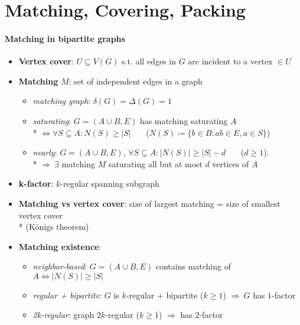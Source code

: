 \section{Matching, Covering, Packing}

\paragraph{Matching in bipartite graphs}
\begin{itemize}
  \item \textbf{Vertex cover}: $ U \subseteq V(G) $ s.t. all edges in $ G $ are incident to a vertex $ \in U $
  \item \textbf{Matching} $ M $: set of independent edges in a graph
  \begin{itemize}
    \item \emph{matching graph}: $ \delta(G) = \Delta(G) = 1 $
    \item \emph{saturating}: $ G = (A \cup B, E) $ has matching saturating $ A $ \\*
       $\Leftrightarrow \forall S \subseteq A : N(S) \geq \vert S \vert $ \ \ \ ($ N(S) \coloneqq \{ b \in B : ab \in E, a \in S \} $)
    \item \emph{nearly}: $ G = (A \cup B, E) $, $ \forall S \subseteq A : \vert N(S) \vert \geq \vert S \vert - d $ \ \ \  ($ d \geq 1 $). \\*
       $ \Rightarrow \ \exists $ matching $ M $ saturating all but at most $ d $ vertices of $ A $
  \end{itemize}
  \item \textbf{k-factor}: $ k $-regular spanning subgraph
  \item \textbf{Matching vs vertex cover}: size of largest matching = size of smallest vertex cover \\* (Königs theorem)
  \item \textbf{Matching existence}:
  \begin{itemize}
    \item \emph{neighbor-based}: $ G = (A \cup B, E) $ contains matching of $ A \Leftrightarrow \vert N(S) \vert \geq \vert S \vert $
    \item \emph{regular + bipartite}: $ G $ is $ k $-regular + bipartite ($ k \geq 1 $) $ \Rightarrow \ G $ has $ 1 $-factor
    \item \emph{2k-regular}: graph $ 2k $-regular ($ k \geq 1 $) $ \Rightarrow $ has $ 2 $-factor
  \end{itemize}

\end{itemize}
